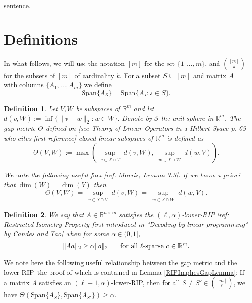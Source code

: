 \documentclass[journal,onecolumn]{IEEEtran}
\newtheorem{definition}{Definition}
\begin{document}
 sentence. 

\section{Definitions}

In what follows, we will use the notation $[m]$ for the set $\{1, ..., m\}$, and ${[m] \choose k}$ for the subsets of $[m]$ of cardinality $k$. For a subset $S \subseteq [m]$ and matrix $A$ with columns $\{A_1,...,A_m\}$ we define
\begin{equation*}
\text{Span}\{A_S\} = \text{Span}\{A_s: s \in S\}.
\end{equation*}

\begin{definition}
Let $V, W$ be subspaces of $\mathbb{R}^m$ and let $d(v,W) := \inf\{\|v-w\|_2: w \in W\}$. Denote by $\mathcal{S}$ the unit sphere in $\mathbb{R}^m$. The \emph{gap} metric $\Theta$ defined on [see Theory of Linear Operators in a Hilbert Space p. 69 who cites first reference] closed linear subspaces of $\mathbb{R}^{m}$ is defined as
\begin{equation}\label{SubspaceMetric}
\Theta(V,W) := \max\left( \sup_{\substack{v \in \mathcal{S} \cap V}} d(v,W), \sup_{\substack{w \in \mathcal{S} \cap W}} d(w,V) \right).
\end{equation}

We note the following useful fact [ref: Morris, Lemma 3.3]: If we know a priori that $\dim(W) = \dim(V)$ then 
\begin{equation}\label{SubspaceMetricSameDim}
\Theta(V,W) = \sup_{\substack{v \in \mathcal{S} \cap V}} d(v,W)  = \sup_{\substack{w \in \mathcal{S} \cap W}} d(w,V).
\end{equation}
\end{definition}

\begin{definition}\label{RestrictedIsometryProperty}
We say that $A \in  \mathbb R^{n \times m}$ satisfies the \emph{$(\ell,\alpha)$-lower-RIP} [ref: Restricted Isometry Property first introduced in "Decoding by linear programming" by Candes and Tao] when for some $\alpha \in (0,1]$,
\begin{align*}
\|Aa\|_2 \geq  \alpha \|a\|_2 \indent \text{ for all $\ell$-sparse } a \in \mathbb{R}^m.
\end{align*}
\end{definition}

We note here the following useful relationship between the gap metric and the lower-RIP, the proof of which is contained  in Lemma \ref{RIPImpliesGapLemma}: If a matrix $A$ satisfies an $(\ell+1,\alpha)$-lower-RIP, then for all $S \neq S' \in {[m] \choose \ell}$, we have $\Theta(\text{Span}\{A_S\},\text{Span}\{A_{S'}\}) \geq \alpha$.
\end{document}
